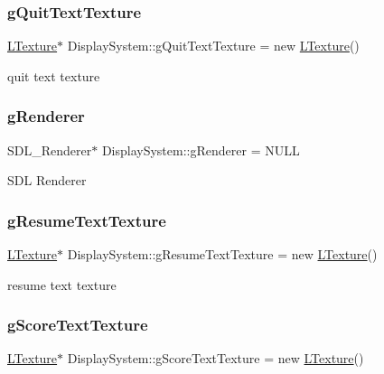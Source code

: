 \subsubsection{\texorpdfstring{g\+Quit\+Text\+Texture}{gQuitTextTexture}}
{\footnotesize\ttfamily \mbox{\hyperlink{class_l_texture}{L\+Texture}}$\ast$ Display\+System\+::g\+Quit\+Text\+Texture = new \mbox{\hyperlink{class_l_texture}{L\+Texture}}()\hspace{0.3cm}{\ttfamily [private]}}

quit text texture \mbox{\label{class_display_system_a711ba89ba3f0430ecb71374ca9835fbf}} 
\subsubsection{\texorpdfstring{g\+Renderer}{gRenderer}}
{\footnotesize\ttfamily S\+D\+L\+\_\+\+Renderer$\ast$ Display\+System\+::g\+Renderer = N\+U\+LL\hspace{0.3cm}{\ttfamily [private]}}

S\+DL Renderer \mbox{\label{class_display_system_ab377658d1ba5a53998157bfbce99f2db}} 
\subsubsection{\texorpdfstring{g\+Resume\+Text\+Texture}{gResumeTextTexture}}
{\footnotesize\ttfamily \mbox{\hyperlink{class_l_texture}{L\+Texture}}$\ast$ Display\+System\+::g\+Resume\+Text\+Texture = new \mbox{\hyperlink{class_l_texture}{L\+Texture}}()\hspace{0.3cm}{\ttfamily [private]}}

resume text texture \mbox{\label{class_display_system_a485da768565e77dc0d9ecc297e475045}} 
\subsubsection{\texorpdfstring{g\+Score\+Text\+Texture}{gScoreTextTexture}}
{\footnotesize\ttfamily \mbox{\hyperlink{class_l_texture}{L\+Texture}}$\ast$ Display\+System\+::g\+Score\+Text\+Texture = new \mbox{\hyperlink{class_l_texture}{L\+Texture}}()\hspace{0.3cm}{\ttfamily [private]}}

